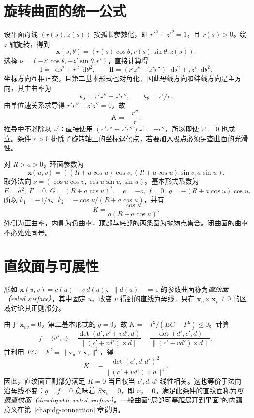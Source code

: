 \documentclass[UTF8,12pt,a4paper,fontset=fandol]{ctexbook}
\newcommand{\dd}{\mathop{}\!\mathrm d}
\newcommand{\ip}[2]{\langle #1,#2\rangle}
\newcommand{\norm}[1]{\lVert #1\rVert}
\begin{document}
\section{旋转曲面的统一公式}
设平面母线 $(r(s),z(s))$ 按弧长参数化，即 $r'^2+z'^2=1$，且 $r(s)>0$。绕 $z$ 轴旋转，得到
\[
 \mathbf x(s,\theta)=(r(s)\cos\theta,r(s)\sin\theta,z(s)).
\]
选择 $\nu=(-z'\cos\theta,-z'\sin\theta,r')$，直接计算得
\begin{equation}
 \mathrm I=\dd s^2+r^2\dd\theta^2,\qquad
 \mathrm{II}=(r'z''-z'r'')\dd s^2+rz'\dd\theta^2.
 \label{eq:dg-revolution-forms}
\end{equation}
坐标方向互相正交，且第二基本形式也对角化，因此母线方向和纬线方向是主方向，其主曲率为
\[
 k_s=r'z''-z'r'',\qquad k_\theta=z'/r.
\]
由单位速关系求导得 $r'r''+z'z''=0$，故
\begin{equation}
 K=-\frac{r''}{r}.
 \label{eq:dg-revolution-K}
\end{equation}
推导中不必除以 $z'$：直接使用 $(r'z''-z'r'')z'=-r''$，所以即使 $z'=0$ 也成立。条件 $r>0$ 排除了旋转轴上的坐标退化点，若要加入极点必须另查曲面的光滑性。

\begin{example}[环面的正负曲率]\label{exam:dg-torus}
对 $R>a>0$，环面参数为
\[
 \mathbf x(u,v)=((R+a\cos u)\cos v,(R+a\cos u)\sin v,a\sin u).
\]
取外法向 $\nu=(\cos u\cos v,\cos u\sin v,\sin u)$。基本形式系数为
\[
 E=a^2,\ F=0,\ G=(R+a\cos u)^2,\quad
 e=-a,\ f=0,\ g=-(R+a\cos u)\cos u.
\]
所以 $k_1=-1/a$、$k_2=-\cos u/(R+a\cos u)$，并有
\[
 K=\frac{\cos u}{a(R+a\cos u)}.
\]
外侧为正曲率，内侧为负曲率，顶部与底部的两条圆为抛物点集合。闭曲面的曲率不必处处同号。
\end{example}

\section{直纹面与可展性}
\begin{definition}[直纹面]
形如 $\mathbf x(u,v)=c(u)+v\,d(u)$、$\norm{d(u)}=1$ 的参数曲面称为\emph{直纹面（ruled surface）}，其中固定 $u$、改变 $v$ 得到的直线为母线。只在 $\mathbf x_u\times\mathbf x_v\ne0$ 的区域讨论其正则部分。
\end{definition}
由于 $\mathbf x_{vv}=0$，第二基本形式的 $g=0$，故 $K=-f^2/(EG-F^2)\le0$。计算
\[
 f=\ip{d'}\nu
 =\frac{\det(d',c'+vd',d)}{\norm{(c'+vd')\times d}}
 =\frac{\det(d',c',d)}{\norm{(c'+vd')\times d}},
\]
并利用 $EG-F^2=\norm{\mathbf x_u\times\mathbf x_v}^2$，得
\begin{equation}
 K=-\frac{\det(c',d,d')^2}{\norm{(c'+vd')\times d}^4}.
 \label{eq:dg-ruled-K}
\end{equation}
因此，直纹面正则部分满足 $K=0$ 当且仅当 $c',d,d'$ 线性相关。这也等价于法向沿母线不变：$g=f=0$ 意味着 $S\mathbf x_v=0$，即 $\nu_v=0$。满足此条件的直纹面称为\emph{可展直纹面（developable ruled surface）}。一般曲面“局部可等距展开到平面”的内蕴意义在第~\ref{chap:dg-connection} 章说明。
\end{document}
